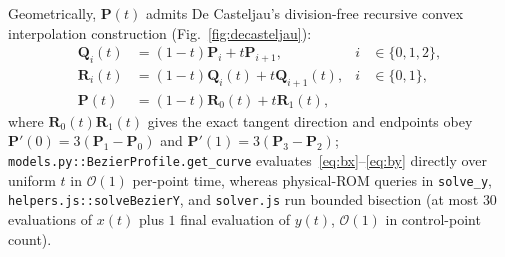 \documentclass[10pt,twocolumn,letterpaper]{article}
\theoremstyle{plain}
\theoremstyle{definition}
\begin{document}
Geometrically, $\mathbf{P}(t)$ admits De Casteljau's division-free recursive convex interpolation construction (Fig.~\ref{fig:decasteljau}):
\begin{align*}
  \mathbf{Q}_i(t) &= (1-t)\mathbf{P}_i + t\mathbf{P}_{i+1}, & i &\in \{0, 1, 2\}, \\
  \mathbf{R}_i(t) &= (1-t)\mathbf{Q}_i(t) + t\mathbf{Q}_{i+1}(t), & i &\in \{0, 1\}, \\
  \mathbf{P}(t) &= (1-t)\mathbf{R}_0(t) + t\mathbf{R}_1(t),
\end{align*}
where $\mathbf{R}_0(t)\mathbf{R}_1(t)$ gives the exact tangent direction and endpoints obey $\mathbf{P}'(0) = 3(\mathbf{P}_1 - \mathbf{P}_0)$ and $\mathbf{P}'(1) = 3(\mathbf{P}_3 - \mathbf{P}_2)$; \texttt{models.py::BezierProfile.get\_curve} evaluates~\eqref{eq:bx}--\eqref{eq:by} directly over uniform $t$ in $\mathcal{O}(1)$ per-point time, whereas physical-ROM queries in \texttt{solve\_y}, \texttt{helpers.js::solveBezierY}, and \texttt{solver.js} run bounded bisection (at most $30$ evaluations of $x(t)$ plus $1$ final evaluation of $y(t)$, $\mathcal{O}(1)$ in control-point count).
\end{document}
